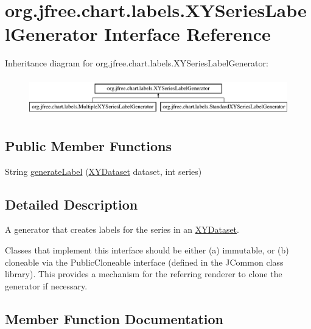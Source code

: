 \hypertarget{interfaceorg_1_1jfree_1_1chart_1_1labels_1_1_x_y_series_label_generator}{}\section{org.\+jfree.\+chart.\+labels.\+X\+Y\+Series\+Label\+Generator Interface Reference}
\label{interfaceorg_1_1jfree_1_1chart_1_1labels_1_1_x_y_series_label_generator}
Inheritance diagram for org.\+jfree.\+chart.\+labels.\+X\+Y\+Series\+Label\+Generator\+:\begin{figure}[H]
\begin{center}
\leavevmode
\includegraphics[height=1.666667cm]{interfaceorg_1_1jfree_1_1chart_1_1labels_1_1_x_y_series_label_generator}
\end{center}
\end{figure}
\subsection*{Public Member Functions}
\begin{DoxyCompactItemize}
\item 
String \mbox{\hyperlink{interfaceorg_1_1jfree_1_1chart_1_1labels_1_1_x_y_series_label_generator_a03bdf2e5c8623657a8f6abc8f467d5b1}{generate\+Label}} (\mbox{\hyperlink{interfaceorg_1_1jfree_1_1data_1_1xy_1_1_x_y_dataset}{X\+Y\+Dataset}} dataset, int series)
\end{DoxyCompactItemize}


\subsection{Detailed Description}
A generator that creates labels for the series in an \mbox{\hyperlink{}{X\+Y\+Dataset}}. 

Classes that implement this interface should be either (a) immutable, or (b) cloneable via the {\ttfamily Public\+Cloneable} interface (defined in the J\+Common class library). This provides a mechanism for the referring renderer to clone the generator if necessary. 

\subsection{Member Function Documentation}
\mbox{\label{interfaceorg_1_1jfree_1_1chart_1_1labels_1_1_x_y_series_label_generator_a03bdf2e5c8623657a8f6abc8f467d5b1}} 
